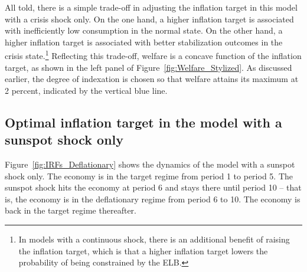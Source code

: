 \documentclass[11pt]{article}
\begin{document}

	All told, there is a simple trade-off in adjusting the inflation target in this model with a crisis shock only. On the one hand, a higher inflation target is associated with inefficiently low consumption in the normal state. On the other hand, a higher inflation target is associated with better stabilization outcomes in the crisis state.\footnote{In models with a continuous shock, there is an additional benefit of raising the inflation target, which is that a higher inflation target lowers the probability of being constrained by the ELB.} Reflecting this trade-off, welfare is a concave function of the inflation target, as shown in the left panel of Figure~\ref{fig:Welfare_Stylized}. As discussed earlier, the degree of indexation is chosen so that welfare attains its maximum at 2 percent, indicated by the vertical blue line.

	\subsection{Optimal inflation target in the model with a sunspot shock only}

	Figure~\ref{fig:IRFs_Deflationary} shows the dynamics of the model with a sunspot shock only. The economy is in the target regime from period 1 to period 5. The sunspot shock hits the economy at period 6 and stays there until period 10 -- that is, the economy is in the deflationary regime from period 6 to 10. The economy is back in the target regime thereafter.
\end{document}
